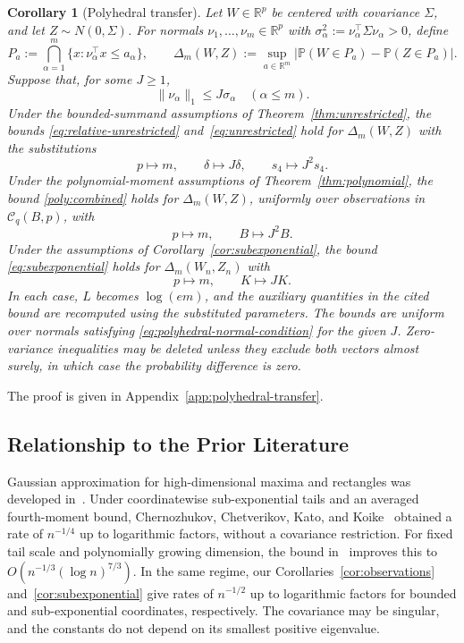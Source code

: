 \documentclass[11pt,letterpaper]{article}
\newenvironment{recovered}{\color{magenta}}{}
\newtheorem{corollary}{Corollary}
\theoremstyle{remark}
\newcommand{\Pp}{\mathbb P}
\newcommand{\R}{\mathbb R}
\begin{document}
\begin{recovered}
\begin{corollary}[Polyhedral transfer]\label{cor:polyhedral-transfer}
Let \(W\in\R^p\) be centered with covariance \(\Sigma\), and let
\(Z\sim N(0,\Sigma)\). For normals \(\nu_1,\ldots,\nu_m\in\R^p\)
with \(\sigma_\alpha^2:=\nu_\alpha^\top\Sigma\nu_\alpha>0\), define
\[
 P_a:=\bigcap_{\alpha=1}^m\{x:\nu_\alpha^\top x\le a_\alpha\},
 \qquad
 \Delta_m(W,Z):=\sup_{a\in\R^m}
 \bigl|\Pp(W\in P_a)-\Pp(Z\in P_a)\bigr|.
\]
Suppose that, for some \(J\ge1\),
\begin{equation}
 \|\nu_\alpha\|_1\le J\sigma_\alpha\quad(\alpha\le m).
 \label{eq:polyhedral-normal-condition}
\end{equation}
Under the bounded-summand assumptions of Theorem~\ref{thm:unrestricted},
the bounds \eqref{eq:relative-unrestricted} and~\eqref{eq:unrestricted}
hold for \(\Delta_m(W,Z)\) with the substitutions
\[
 p\mapsto m,\qquad \delta\mapsto J\delta,\qquad s_4\mapsto J^2s_4.
\]
Under the polynomial-moment assumptions of Theorem~\ref{thm:polynomial},
the bound \eqref{poly:combined} holds for \(\Delta_m(W,Z)\), uniformly
over observations in \(\mathcal C_q(B,p)\), with
\[
 p\mapsto m,\qquad B\mapsto J^2B.
\]
Under the assumptions of Corollary~\ref{cor:subexponential},
the bound \eqref{eq:subexponential} holds for \(\Delta_m(W_n,Z_n)\) with
\[
 p\mapsto m,\qquad K\mapsto JK.
\]
In each case, \(L\) becomes \(\log(em)\), and the auxiliary quantities
in the cited bound are recomputed using the substituted parameters.
The bounds are uniform over normals satisfying
\eqref{eq:polyhedral-normal-condition} for the given \(J\).
Zero-variance inequalities may be deleted unless they exclude both
vectors almost surely, in which case the probability difference is zero.
\end{corollary}
\end{recovered}

\begin{recovered}
The proof is given in Appendix~\ref{app:polyhedral-transfer}.
\end{recovered}


\subsection{Relationship to the Prior Literature}\label{sec:literature}

Gaussian approximation for high-dimensional maxima and rectangles was
developed in~\cite{CCK2013,CCK2017}. Under coordinatewise sub-exponential
tails and an averaged fourth-moment bound, Chernozhukov, Chetverikov,
Kato, and Koike~\cite[Theorem~2.1]{CCKK2022} obtained a rate of
\(n^{-1/4}\) up to logarithmic factors, without a covariance restriction.
For fixed tail scale and polynomially growing dimension, the bound
in~\cite[Theorem~1]{GaoZhang} improves this to
\(O(n^{-1/3}(\log n)^{7/3})\).
In the same regime, our Corollaries~\ref{cor:observations}
and~\ref{cor:subexponential} give rates of \(n^{-1/2}\) up to logarithmic
factors for bounded and sub-exponential coordinates, respectively.
The covariance may be singular, and the constants do not depend on its
smallest positive eigenvalue.
\end{document}
